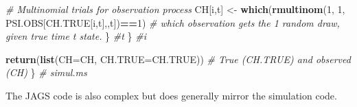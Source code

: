 \documentclass[
]{krantz}
\makeatletter
\newenvironment{Shaded}{\begin{snugshade}}{\end{snugshade}}
\newcommand{\AttributeTok}[1]{\textcolor[rgb]{0.27,0.27,0.27}{#1}}
\newcommand{\CommentTok}[1]{\textcolor[rgb]{0.37,0.37,0.37}{\textit{#1}}}
\newcommand{\DecValTok}[1]{\textcolor[rgb]{0.06,0.06,0.06}{#1}}
\newcommand{\FunctionTok}[1]{\textcolor[rgb]{0.27,0.27,0.27}{\textbf{#1}}}
\newcommand{\NormalTok}[1]{#1}
\newcommand{\OtherTok}[1]{\textcolor[rgb]{0.37,0.37,0.37}{#1}}
\newcommand{\SpecialCharTok}[1]{\textcolor[rgb]{0.43,0.43,0.43}{\textbf{#1}}}
\newenvironment{kframe}{%
\medskip{}
\setlength{\fboxsep}{.8em}
 \def\at@end@of@kframe{}%
 \ifinner\ifhmode%
  \def\at@end@of@kframe{\end{minipage}}%
  \begin{minipage}{\columnwidth}%
 \fi\fi%
 \def\FrameCommand##1{\hskip\@totalleftmargin \hskip-\fboxsep
 \colorbox{shadecolor}{##1}\hskip-\fboxsep
     \hskip-\linewidth \hskip-\@totalleftmargin \hskip\columnwidth}%
 \MakeFramed {\advance\hsize-\width
   \@totalleftmargin\z@ \linewidth\hsize
   \@setminipage}}%
 {\par\unskip\endMakeFramed%
 \at@end@of@kframe}
\renewenvironment{Shaded}{\begin{kframe}}{\end{kframe}}
\makeatother
\begin{document}
\begin{Shaded}
\begin{Highlighting}[]
         \CommentTok{\# Multinomial trials for observation process}
\NormalTok{         CH[i,t] }\OtherTok{\textless{}{-}} \FunctionTok{which}\NormalTok{(}\FunctionTok{rmultinom}\NormalTok{(}\DecValTok{1}\NormalTok{, }\DecValTok{1}\NormalTok{, PSI.OBS[CH.TRUE[i,t],,t])}\SpecialCharTok{==}\DecValTok{1}\NormalTok{)}
         \CommentTok{\# which observation gets the 1 random draw, given true time t state.}
\NormalTok{         \} }\CommentTok{\#t}
\NormalTok{      \} }\CommentTok{\#i}

    \FunctionTok{return}\NormalTok{(}\FunctionTok{list}\NormalTok{(}\AttributeTok{CH=}\NormalTok{CH, }\AttributeTok{CH.TRUE=}\NormalTok{CH.TRUE)) }\CommentTok{\# True (CH.TRUE) and observed (CH)}
\NormalTok{   \} }\CommentTok{\# simul.ms}
\end{Highlighting}
\end{Shaded}

The JAGS code is also complex but does generally mirror the simulation code.
\end{document}
